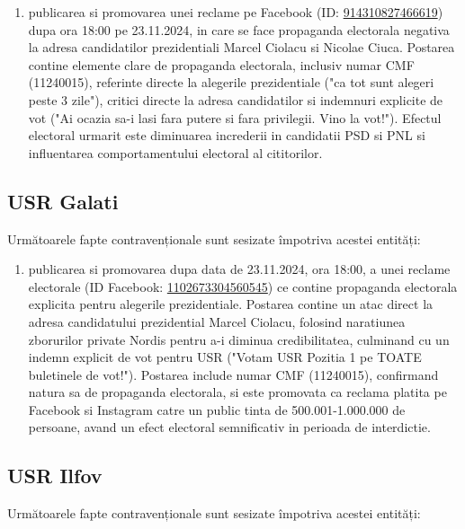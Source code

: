 \documentclass[a4paper,12pt]{article}
\begin{document}
\begin{enumerate}[leftmargin=*, label=\arabic*.)]
    \item publicarea si promovarea unei reclame pe Facebook (ID: \href{https://www.facebook.com/ads/library/?id=914310827466619}{914310827466619}) dupa ora 18:00 pe 23.11.2024, in care se face propaganda electorala negativa la adresa candidatilor prezidentiali Marcel Ciolacu si Nicolae Ciuca. Postarea contine elemente clare de propaganda electorala, inclusiv numar CMF (11240015), referinte directe la alegerile prezidentiale ("ca tot sunt alegeri peste 3 zile"), critici directe la adresa candidatilor si indemnuri explicite de vot ("Ai ocazia sa-i lasi fara putere si fara privilegii. Vino la vot!"). Efectul electoral urmarit este diminuarea increderii in candidatii PSD si PNL si influentarea comportamentului electoral al cititorilor.
\end{enumerate}

\vspace{0.5cm}

\subsection{USR Galati}
Următoarele fapte contravenționale sunt sesizate împotriva acestei entități:

\begin{enumerate}[leftmargin=*, label=\arabic*.)]
    \item publicarea si promovarea dupa data de 23.11.2024, ora 18:00, a unei reclame electorale (ID Facebook: \href{https://www.facebook.com/ads/library/?id=1102673304560545}{1102673304560545}) ce contine propaganda electorala explicita pentru alegerile prezidentiale. Postarea contine un atac direct la adresa candidatului prezidential Marcel Ciolacu, folosind naratiunea zborurilor private Nordis pentru a-i diminua credibilitatea, culminand cu un indemn explicit de vot pentru USR ("Votam USR  Pozitia 1 pe TOATE buletinele de vot!"). Postarea include numar CMF (11240015), confirmand natura sa de propaganda electorala, si este promovata ca reclama platita pe Facebook si Instagram catre un public tinta de 500.001-1.000.000 de persoane, avand un efect electoral semnificativ in perioada de interdictie.
\end{enumerate}

\vspace{0.5cm}

\subsection{USR Ilfov}
Următoarele fapte contravenționale sunt sesizate împotriva acestei entități:
\end{document}
